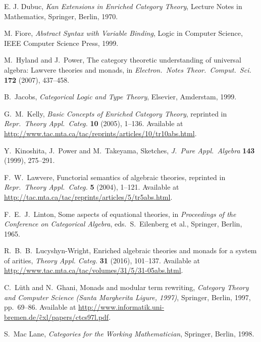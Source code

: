 \documentclass{amsart}
\theoremstyle{definition}
\begin{document}
\begin{thebibliography}{100}
 E. J. Dubuc, \textsl{Kan Extensions in Enriched Category Theory}, Lecture Notes in Mathematics, Springer, Berlin, 1970.

 M. Fiore, \textsl{Abstract Syntax with Variable Binding}, Logic in Computer Science, IEEE Computer Science Press, 1999.

 M.\ Hyland and J.\ Power, The category theoretic understanding of 
universal algebra: Lawvere theories and monads, in \textsl{Electron.\ Notes Theor.\ Comput.\ Sci.} \textbf{172} (2007), 437--458.

 B.\ Jacobs, \textsl{Categorical Logic and Type Theory}, Elsevier, Amderstam, 1999.
	
 G.\ M.\ Kelly, \textsl{Basic Concepts of Enriched Category Theory}, reprinted in \textsl{Repr.\ Theory Appl.\ Categ.} \textbf{10} (2005), 1--136.  Available at \href{http://www.tac.mta.ca/tac/reprints/articles/10/tr10abs.html}{http://www.tac.mta.ca/tac/reprints/articles/10/tr10abs.html}.

 Y.\ Kinoshita, J.\ Power and M.\ Takeyama, Sketches,
\textsl{J.\ Pure Appl.\ Algebra} \textbf{143} (1999), 275--291.

 F.\ W.\ Lawvere, Functorial semantics of algebraic theories, reprinted in
\textsl{Repr.\ Theory Appl.\ Categ.} \textbf{5} (2004), 1--121.  Available at \href{http://tac.mta.ca/tac/reprints/articles/5/tr5abs.html}{http://tac.mta.ca/tac/reprints/articles/5/tr5abs.html}.

 F.\ E.\ J.\ Linton, Some aspects of equational theories, in 
\textsl{Proceedings of the Conference on Categorical Algebra}, eds.\ S.\ Eilenberg et al.,
Springer, Berlin, 1965.

 R.\ B.\ B.\ Lucyshyn-Wright, Enriched algebraic theories and monads for a system of arities, \textsl{Theory Appl. Categ.} \textbf{31} (2016), 101--137.  Available at \href{http://www.tac.mta.ca/tac/volumes/31/5/31-05abs.html}{http://www.tac.mta.ca/tac/volumes/31/5/31-05abs.html}.
	
 C.\ L\"{u}th and N.\ Ghani, Monads and modular term rewriting,
\textsl{Category Theory and Computer Science ({S}anta {M}argherita Ligure, 1997)}, Springer, Berlin, 1997, pp.\ 69--86.  Available at \href{http://www.informatik.uni-bremen.de/~cxl/papers/ctcs97l.pdf}{http://www.informatik.uni-bremen.de/\~cxl/papers/ctcs97l.pdf}.

 S.\ Mac Lane, \textsl{Categories for the Working Mathematician}, Springer, Berlin, 1998.  


\end{thebibliography}
\end{document}
